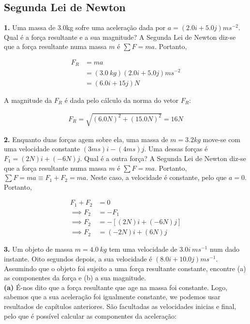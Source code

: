 \subsection{Segunda Lei de Newton}
\textbf{1.} Uma massa de 3.0kg sofre uma aceleração dada por $a=(2.0i + 5.0j)ms^{-2}$. Qual é a força resultante e a sua magnitude?
\linebreak
A Segunda Lei de Newton diz-se que a força resultante numa massa $m$ é $\sum F = ma$. Portanto,

$$
\begin{aligned}
    F_{R}&=ma \\
        &=(3.0\ kg)(2.0i+5.0j)ms^{-2} \\
        &=(6.0i + 15j)N
\end{aligned}
$$

A magnitude da $F_{R}$ é dada pelo cálculo da norma do vetor $F_{R}$:

$$
\begin{aligned}
    F_{R}=\sqrt{(6.0N)^2+(15.0N)^2}=16N
\end{aligned}
$$

\textbf{2.} Enquanto duas forças agem sobre ela, uma massa de $m=3.2kg$ move-se com uma velocidade constante $(3ms)i-(4ms)j$. Uma dessas forças é $F_1=(2N)i+(-6N)j$. Qual é a outra força?
\linebreak
A Segunda Lei de Newton diz-se que a força resultante numa massa $m$ é $\sum F = ma$. Portanto, $\sum F = ma \equiv F_1+F_2=ma$. Neste caso, a velocidade é constante, pelo que $a=0$. Portanto,

$$
\begin{aligned}
    F_1+F_2&=0 \\
    \implies F_2&=-F_1 \\
    \implies F_2&=-[(2N)i+(-6N)j] \\
    \implies F_2&=(-2N)i+(6N)j
\end{aligned}
$$

\textbf{3.} Um objeto de massa $m=4.0\ kg$ tem uma velocidade de $3.0i\ ms^{-1}$ num dado instante. Oito segundos depois, a sua velocidade é $(8.0i+10.0j)ms^{-1}$. Assumindo que o objeto foi sujeito a uma força resultante constante, encontre (a) as componentes da força e (b) a sua magnitude. \\
\linebreak
\textbf{(a)} É-nos dito que a força resultante que age na massa foi constante. Logo, sabemos que a sua aceleração foi igualmente constante, we podemos usar resultados de capítulos anteriores. São facultadas as velocidades inicias e final, pelo que é possível calcular as componentes da aceleração:

